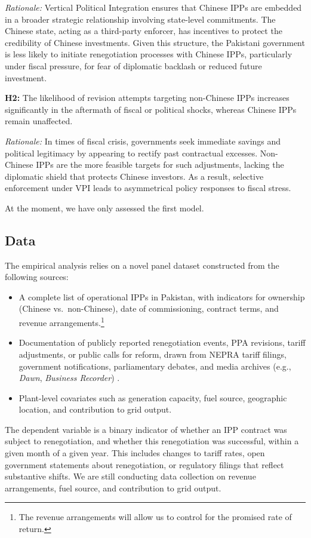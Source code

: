 \documentclass[12pt]{article}
\begin{document}
\textit{Rationale:} Vertical Political Integration ensures that Chinese IPPs are embedded in a broader strategic relationship involving state-level commitments. The Chinese state, acting as a third-party enforcer, has incentives to protect the credibility of Chinese investments. Given this structure, the Pakistani government is less likely to initiate renegotiation processes with Chinese IPPs, particularly under fiscal pressure, for fear of diplomatic backlash or reduced future investment.

\textbf{H2:} The likelihood of revision attempts targeting non-Chinese IPPs increases significantly in the aftermath of fiscal or political shocks, whereas Chinese IPPs remain unaffected.

\textit{Rationale:} In times of fiscal crisis, governments seek immediate savings and political legitimacy by appearing to rectify past contractual excesses. Non-Chinese IPPs are the more feasible targets for such adjustments, lacking the diplomatic shield that protects Chinese investors. As a result, selective enforcement under VPI leads to asymmetrical policy responses to fiscal stress.

At the moment, we have only assessed the first model.

\subsection{Data}
The empirical analysis relies on a novel panel dataset constructed from the following sources:
\begin{itemize}
    \item A complete list of operational IPPs in Pakistan, with indicators for ownership (Chinese vs.\ non-Chinese), date of commissioning, contract terms, and revenue arrangements.\footnote{The revenue arrangements will allow us to control for the promised rate of return.}
    \item Documentation of publicly reported renegotiation events, PPA revisions, tariff adjustments, or public calls for reform, drawn from NEPRA tariff filings, government notifications, parliamentary debates, and media archives (e.g., \textit{Dawn}, \textit{Business Recorder}) \citep{BusinessRecorder2024a,BusinessRecorder2024b,Kiani2024}.
    \item Plant-level covariates such as generation capacity, fuel source, geographic location, and contribution to grid output.
\end{itemize}

The dependent variable is a binary indicator of whether an IPP contract was subject to renegotiation, and whether this renegotiation was successful, within a given month of a given year. This includes changes to tariff rates, open government statements about renegotiation, or regulatory filings that reflect substantive shifts. We are still conducting data collection on revenue arrangements, fuel source, and contribution to grid output.
\end{document}
